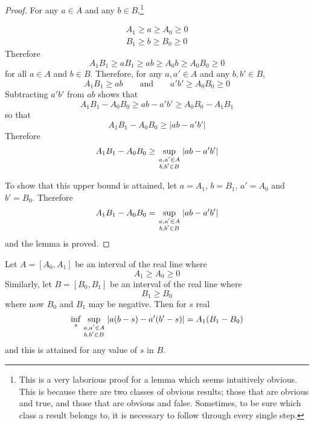 \begin{proof} For any $a\in A$ and any $b\in B$,\footnote{This is a very
laborious proof for a lemma which seems intuitively obvious.  This is
because there are two classes of obvious results; those that are obvious and
true, and those that are obvious and false.  Sometimes, to be sure
which class a result belongs to, it is necessary to follow through
every single step.}

\begin{eqnarray}
&A_1\geq a\geq A_0\geq 0&\\
&B_1\geq b\geq B_0\geq 0&
\end{eqnarray}
Therefore
\begin{equation}
A_1B_1\geq aB_1\geq ab\geq A_0b\geq A_0B_0\geq 0
\end{equation}
for all $a\in A$ and $b\in B$.  Therefore, for any $a,a'\in A$ and any
$b,b'\in B$,
\begin{equation}
A_1B_1\geq ab\qquad\mbox{and}\qquad a'b'\geq A_0B_0\geq 0
\end{equation}
Subtracting $a'b'$ from $ab$ shows that
\begin{equation}
A_1B_1-A_0B_0\geq ab-a'b'\geq A_0B_0-A_1B_1
\end{equation}
so that 
\begin{equation}
A_1B_1-A_0B_0\geq \left|ab-a'b'\right|
\end{equation}
Therefore
\begin{equation}
A_1B_1-A_0B_0\geq\sup_{\scriptstyle a,a'\in A\atop\scriptstyle b,b'\in B}
\left|ab-a'b'\right|
\end{equation}

To show that this upper bound is attained, let $a=A_1$, $b=B_1$, $a'=A_0$
and $b'=B_0$.  Therefore
\begin{equation}
A_1B_1-A_0B_0=\sup_{\scriptstyle a,a'\in A\atop\scriptstyle b,b'\in B}  
\left|ab-a'b'\right|
\end{equation}
and the lemma is proved.
\end{proof}


\begin{theorem}
\label{rmc thm:theorem}
Let $A=[A_0,A_1]$ be an interval of the real line where 
\begin{equation}
A_1\geq A_0\geq 0
\end{equation}
Similarly, let $B=[B_0,B_1]$ be an interval of the real line where
\begin{equation}
B_1\geq B_0
\end{equation}
where now $B_0$ and $B_1$ may be negative.  Then for $s$ real
\begin{equation}
\inf_s\sup_{\scriptstyle a,a'\in A\atop\scriptstyle b,b'\in B}
\left|a(b-s)-a'(b'-s)\right|=A_1(B_1-B_0)
\end{equation}
and this is attained for any value of $s$ in $B$.
\end{theorem}

